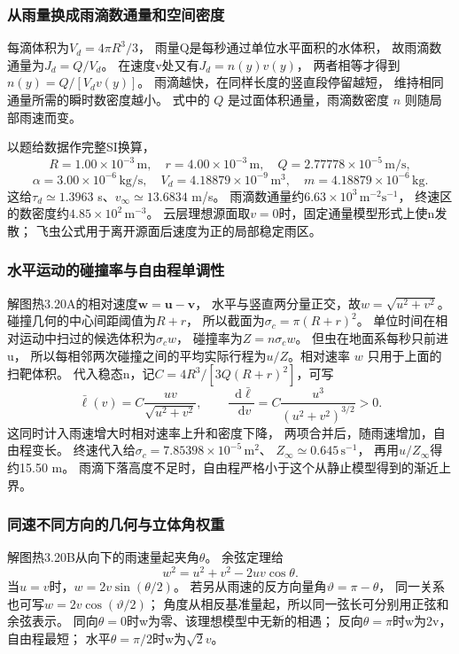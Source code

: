 \documentclass[UTF8,fontset=fandol,a4paper,11pt]{ctexart}
\newcommand{\dd}{\mathop{}\!\mathrm{d}}
\begin{document}
\subsubsection*{从雨量换成雨滴数通量和空间密度}
每滴体积为$V_d=4\pi R^3/3$，
雨量Q是每秒通过单位水平面积的水体积，
故雨滴数通量为$J_d=Q/V_d$。
在速度v处又有$J_d=n(y)v(y)$，
两者相等才得到$n(y)=Q/[V_dv(y)]$。
雨滴越快，在同样长度的竖直段停留越短，
维持相同通量所需的瞬时数密度越小。
式中的 $Q$ 是过面体积通量，雨滴数密度 $n$ 则随局部雨速而变。

以题给数据作完整SI换算，
\[
R=1.00\times10^{-3}\,\mathrm m,\quad
r=4.00\times10^{-3}\,\mathrm m,\quad
Q=2.77778\times10^{-5}\,\mathrm{m/s},
\]
\[
\alpha=3.00\times10^{-6}\,\mathrm{kg/s},\quad
V_d=4.18879\times10^{-9}\,\mathrm{m^3},\quad
m=4.18879\times10^{-6}\,\mathrm{kg}.
\]
这给$\tau_d\simeq1.3963$ s、$v_\infty\simeq13.6834$ m/s。
雨滴数通量约$6.63\times10^3\,\mathrm{m^{-2}s^{-1}}$，
终速区的数密度约$4.85\times10^2\,\mathrm{m^{-3}}$。
云层理想源面取$v=0$时，固定通量模型形式上使n发散；
飞虫公式用于离开源面后速度为正的局部稳定雨区。

\subsubsection*{水平运动的碰撞率与自由程单调性}
解图热3.20A的相对速度$\bm w=\bm u-\bm v$，
水平与竖直两分量正交，故$w=\sqrt{u^2+v^2}$。
碰撞几何的中心间距阈值为$R+r$，
所以截面为$\sigma_c=\pi(R+r)^2$。
单位时间在相对运动中扫过的候选体积为$\sigma_cw$，
碰撞率为$Z=n\sigma_cw$。
但虫在地面系每秒只前进u，
所以每相邻两次碰撞之间的平均实际行程为$u/Z$。相对速率 $w$ 只用于上面的扫靶体积。
代入稳态n，记$C=4R^3/[3Q(R+r)^2]$，可写
\[
\bar\ell(v)=C\frac{uv}{\sqrt{u^2+v^2}},\qquad
\frac{\dd\bar\ell}{\dd v}
=C\frac{u^3}{(u^2+v^2)^{3/2}}>0.
\]
这同时计入雨速增大时相对速率上升和密度下降，
两项合并后，随雨速增加，自由程变长。
终速代入给$\sigma_c=7.85398\times10^{-5}\,\mathrm{m^2}$、
$Z_\infty\simeq0.645\,\mathrm{s^{-1}}$，
再用$u/Z_\infty$得约15.50 m。
雨滴下落高度不足时，自由程严格小于这个从静止模型得到的渐近上界。

\subsubsection*{同速不同方向的几何与立体角权重}
解图热3.20B从向下的雨速量起夹角$\theta$。
余弦定理给
\[
w^2=u^2+v^2-2uv\cos\theta.
\]
当$u=v$时，$w=2v\sin(\theta/2)$。
若另从雨速的反方向量角$\vartheta=\pi-\theta$，
同一关系也可写$w=2v\cos(\vartheta/2)$；
角度从相反基准量起，所以同一弦长可分别用正弦和余弦表示。
同向$\theta=0$时w为零、该理想模型中无新的相遇；
反向$\theta=\pi$时w为2v，自由程最短；
水平$\theta=\pi/2$时w为$\sqrt2v$。
\end{document}
